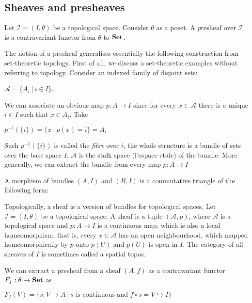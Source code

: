 \documentclass[a4paper]{article}
\theoremstyle{defin}
\theoremstyle{theorem}
\theoremstyle{claim}
\theoremstyle{prop}
\theoremstyle{lemma}
\theoremstyle{fact}
\theoremstyle{ex}
\theoremstyle{col}
\begin{document}
\subsection{Sheaves and presheaves}

Let $\mathcal{I} = (I, \theta)$ be a topological space. Consider $\theta$ as a poset. A {\emph presheaf} over $\mathcal{I}$ is a contravariant functor from $\theta$ to ${\bf Set}$.

The notion of a presheaf generalises essentially the following construction from set-theoretic topology. First of all, we discuss a set-theoretic examples without referring to topology. Consider an indexed family of disjoint sets:
\begin{center}
$\mathcal{A} = \{ A_i \: | \: i \in I \}$.
\end{center}
We can associate an obvious map $p : A \to I$ since for every $x \in \mathcal{A}$ there is a unique $i \in I$ such that $x \in A_i$. Take

\begin{center}
$p^{-1}(\{ i \}) = \{ x \: | \: p(x) = i\} = A_i$
\end{center}

Such $p^{-1}(\{ i \})$ is called the \emph{fibre} over $i$, the whole structure is a bundle of sets over the base space $I$, $\mathcal{A}$ is the stalk space (l'espace etale) of the bundle. More generally, we can extract the bundle from every map $p : A \to I$

A morphism of bundles $(A, I)$ and $(B, I)$ is a commutative triangle of the following form:


Topologically, a sheaf is a version of bundles for topological spaces. Let $\mathcal{I} = (I, \theta)$ be a topological space. A sheaf is a tuple $(\mathcal{A}, p)$, where $\mathcal{A}$ is a topological space and $p : A \to I$ is a continuous map, which is also a local homeomorphism, that is, every $x \in \mathcal{A}$ has an open neighbourhood, which mapped homeomorphically by $p$ onto $p(U)$ and $p(U)$ is open in $I$. The category of all sheaves of $I$ is sometimes called a spatial topos.

We can extract a presheaf from a sheaf $(A, f)$ as a contravariant functor $F_f : \theta \to {\bf Set}$ as
\begin{center}
$F_f(V) = \{ s : V \to A \: | \: \text{$s$ is continuous and $f \circ s = V \hookrightarrow I $}\}$
\end{center}
\end{document}
